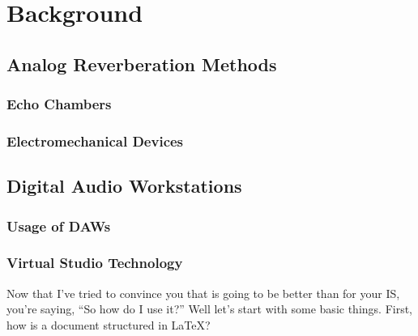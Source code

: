 \chapter{Background}
\section{Analog Reverberation Methods}
\subsection{Echo Chambers}
\subsection{Electromechanical Devices}
\section{Digital Audio Workstations}
\subsection{Usage of DAWs}
\subsection{Virtual Studio Technology}
Now that I've tried to convince you that \lt is going to be better than \msw for your IS, you're saying, ``So how do I use it?'' Well let's start with some basic things. First, how is a document structured in \LaTeX \citet{ophs03}?
